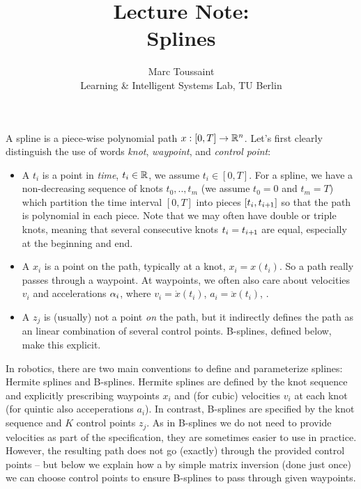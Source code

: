 
\note

\title{Lecture Note:\\ Splines}
\author{Marc Toussaint\\\small Learning \& Intelligent Systems Lab, TU Berlin}

\makeatletter
\renewcommand{\@seccntformat}[1]{}
\makeatother

\newcommand{\des}{\text{des}}
\renewcommand{\Ref}{\text{ref}}
\renewcommand{\t}{\theta}
\renewcommand{\hat}{\widehat}
\newcommand{\bbg}{{\bar{\bar g}}}

\notetitle


A spline is a piece-wise polynomial path $x:[0,T] \to {\mathbb{R}}^n$. Let's
first clearly distinguish the use of words \emph{knot},
\emph{waypoint}, and \emph{control point}:
\begin{itemize}
\item A  $t_i$ is a point in \emph{time}, $t_i \in {\mathbb{R}}$,
  we assume $t_i \in [0,T]$. For a spline, we have a non-decreasing
  sequence of knots $t_0,..,t_m$ (we assume $t_0=0$ and $t_m=T$) which
  partition the time interval $[0,T]$ into pieces $[t_i, t_{i{{\hspace*{-.0pt}\text{\rm +}\hspace*{-.5pt}}1}}]$ so
  that the path is polynomial in each piece. Note that we may often
  have double or triple knots, meaning that several consecutive knots
  $t_i = t_{i{{\hspace*{-.0pt}\text{\rm +}\hspace*{-.5pt}}1}}$ are equal, especially at the beginning and end.
\item A  $x_i$ is a point on the path, typically at a
  knot, $x_i = x(t_i)$. So a path really passes through a waypoint. At
  waypoints, we often also care about velocities $v_i$ and
  accelerations $\alpha_i$, where $v_i = \dot x(t_i)$, $a_i = \ddot x(t_i)$, .
\item A  $z_j$ is (usually) not a point \emph{on}
  the path, but it indirectly defines the path as an linear
  combination of several control points. B-splines, defined below,
  make this explicit.
\end{itemize}

In robotics, there are two main conventions to define and parameterize
splines: Hermite splines and B-splines. Hermite splines are defined by
the knot sequence and explicitly prescribing waypoints $x_i$ and (for
cubic) velocities $v_i$ at each knot (for quintic also acceperations
$a_i$). In contrast, B-splines are specified by the knot sequence and
$K$ control points $z_j$. As in B-splines we do not need to provide
velocities as part of the specification, they are sometimes easier to
use in practice. However, the resulting path does not go (exactly)
through the provided control points -- but below we explain how a
by simple matrix inversion (done just once) we can choose control
points to ensure B-splines to pass through given waypoints.


